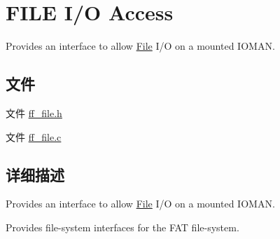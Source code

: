 \hypertarget{group___f_i_l_e_i_o}{}\section{F\+I\+LE I/O Access}
\label{group___f_i_l_e_i_o}


Provides an interface to allow \hyperlink{class_file}{File} I/O on a mounted I\+O\+M\+AN.  


\subsection*{文件}
\begin{DoxyCompactItemize}
\item 
文件 \hyperlink{ff__file_8h}{ff\+\_\+file.\+h}
\item 
文件 \hyperlink{ff__file_8c}{ff\+\_\+file.\+c}
\end{DoxyCompactItemize}


\subsection{详细描述}
Provides an interface to allow \hyperlink{class_file}{File} I/O on a mounted I\+O\+M\+AN. 

Provides file-\/system interfaces for the F\+AT file-\/system. 